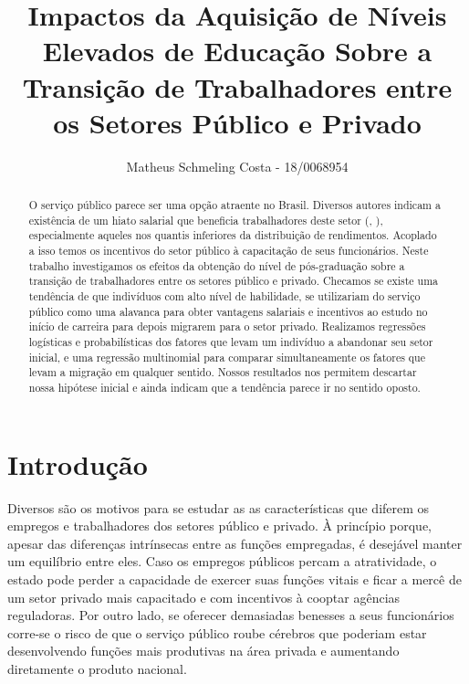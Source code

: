 \documentclass[a4paper]{article}
\title{Impactos da Aquisição de Níveis Elevados de Educação Sobre a Transição de Trabalhadores entre os Setores Público e Privado}
\author{Matheus Schmeling Costa - 18/0068954}
\begin{document}
\maketitle

\begin{abstract}

O serviço público parece ser uma opção atraente no Brasil. Diversos autores indicam a existência de um hiato salarial que beneficia trabalhadores deste setor (\citet{barros2000}, \citet{belluzzo2005}), especialmente aqueles nos quantis inferiores da distribuição de rendimentos. Acoplado a isso temos os incentivos do setor público à capacitação de seus funcionários. Neste trabalho investigamos os efeitos da obtenção do nível de pós-graduação sobre a transição de trabalhadores entre os setores público e privado. Checamos se existe uma tendência de que indivíduos com alto nível de habilidade, se utilizariam do serviço público como uma alavanca para obter vantagens salariais e incentivos ao estudo no início de carreira para depois migrarem para o setor privado. Realizamos regressões logísticas e probabilísticas dos fatores que levam um indivíduo a abandonar seu setor inicial, e uma regressão multinomial para comparar simultaneamente os fatores que levam a migração em qualquer sentido. Nossos resultados nos permitem descartar nossa hipótese inicial e ainda indicam que a tendência parece ir no sentido oposto.

\end{abstract}

\section{Introdução}

Diversos são os motivos para se estudar as as características que diferem os empregos e trabalhadores dos setores público e privado. À princípio porque, apesar das diferenças intrínsecas entre as funções empregadas, é desejável manter um equilíbrio entre eles. Caso os empregos públicos percam a atratividade, o estado pode perder a capacidade de exercer suas funções vitais e ficar a mercê de um setor privado mais capacitado e com incentivos à cooptar agências reguladoras. Por outro lado, se oferecer demasiadas benesses a seus funcionários corre-se o risco de que o serviço público roube cérebros que poderiam estar desenvolvendo funções mais produtivas na área privada e aumentando diretamente o produto nacional.
\end{document}
